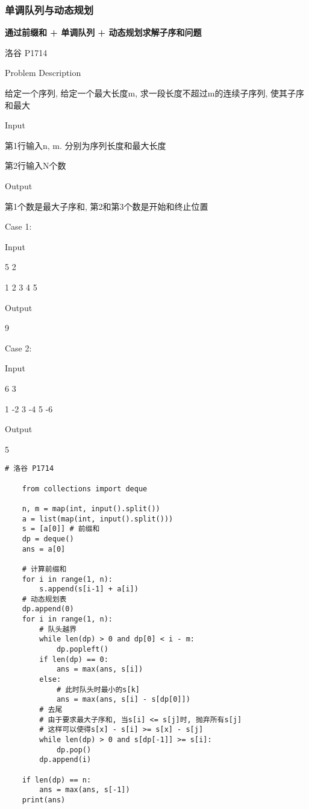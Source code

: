 \documentclass[../main]{subfiles}
\begin{document}
\subsubsection{单调队列与动态规划}

\textbf{通过前缀和 + 单调队列 + 动态规划求解子序和问题}

洛谷 P1714

Problem Description

给定一个序列, 给定一个最大长度m, 求一段长度不超过m的连续子序列, 使其子序和最大
 

Input

第1行输入n, m. 分别为序列长度和最大长度

第2行输入N个数

Output

第1个数是最大子序和, 第2和第3个数是开始和终止位置
 
Case 1:

Input

5 2

1 2 3 4 5

Output

9

Case 2:

Input

6 3

1 -2 3 -4 5 -6
 
Output

5

\begin{lstlisting}[style = Python]
    # 洛谷 P1714

    from collections import deque
    
    n, m = map(int, input().split())
    a = list(map(int, input().split()))
    s = [a[0]] # 前缀和
    dp = deque()
    ans = a[0]
    
    # 计算前缀和
    for i in range(1, n):
        s.append(s[i-1] + a[i])
    # 动态规划表
    dp.append(0)
    for i in range(1, n):
        # 队头越界
        while len(dp) > 0 and dp[0] < i - m:
            dp.popleft()
        if len(dp) == 0:
            ans = max(ans, s[i])
        else:
            # 此时队头时最小的s[k]
            ans = max(ans, s[i] - s[dp[0]])
        # 去尾
        # 由于要求最大子序和, 当s[i] <= s[j]时, 抛弃所有s[j]
        # 这样可以使得s[x] - s[i] >= s[x] - s[j]
        while len(dp) > 0 and s[dp[-1]] >= s[i]:
            dp.pop()
        dp.append(i)
        
    if len(dp) == n:
        ans = max(ans, s[-1])
    print(ans)
\end{lstlisting}
\end{document}
